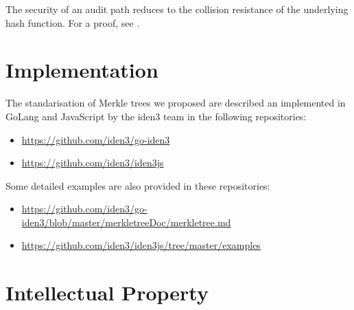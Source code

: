 \documentclass{article}
\begin{document}
\begin{spacing}{1.2}
The  security  of  an  audit  path  reduces  to  the  collision  resistance  of the underlying hash function. For a proof, see \cite[Lemma 1]{security-mt}. 

\section{Implementation}

The standarisation of Merkle trees we proposed are described an implemented in GoLang and JavaScript by the iden3 team in the following repositories:
\begin{itemize}
	\item \url{https://github.com/iden3/go-iden3}
	\item \url{https://github.com/iden3/iden3js}
\end{itemize}

Some detailed examples are also provided in these repositories:
\begin{itemize}
	\item\url{https://github.com/iden3/go-iden3/blob/master/merkletreeDoc/merkletree.md}
	\item\url{https://github.com/iden3/iden3js/tree/master/examples}
\end{itemize}

\section {Intellectual Property}





\end{spacing}
\end{document}

